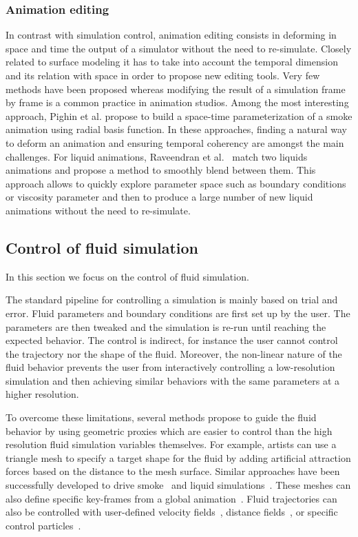 \subsubsection{Animation editing} 
In contrast with simulation control, animation editing consists in deforming in space and time the output of a simulator without the need to re-simulate. 
Closely related to surface modeling it has to take into account the temporal dimension and its relation with space in order to propose new editing tools. 
Very few methods have been proposed whereas modifying the result of a simulation frame by frame is a common practice in animation studios. 
Among the most interesting approach, Pighin et al.\cite{Pighin2004} propose to build a space-time parameterization of a smoke animation using radial basis function. 
In these approaches, finding a natural way to deform an animation and ensuring temporal coherency are amongst the main challenges. 
For liquid animations, Raveendran et al.~\cite{Raveendran2014} match two liquids animations and propose a method to smoothly blend between them. 
This approach allows to quickly explore parameter space such as boundary conditions or viscosity parameter and then to produce a large number of new liquid animations without the need to re-simulate.

\subsection{Control of fluid simulation}
\label{subsec:fluidControl}
In this section we focus on the control of fluid simulation.

The standard pipeline for controlling a simulation is mainly based on trial and error. Fluid parameters and boundary conditions are first set up by the user. The parameters are then tweaked and the simulation is re-run until reaching the expected behavior. The control is indirect, for instance the user cannot control the trajectory nor the shape of the fluid. Moreover, the non-linear nature of the fluid behavior prevents the user from interactively controlling a low-resolution simulation and then achieving similar behaviors with the same parameters at a higher resolution.

To overcome these limitations, several methods propose to guide the fluid behavior by using geometric proxies which are easier to control than the high resolution fluid simulation variables themselves.
For example, artists can use a triangle mesh to specify a target shape for the fluid by adding artificial attraction forces based on the distance to the mesh surface. Similar approaches have been successfully developed to drive smoke~\cite{Fattal2004,Hong2004,Shi2005a} and liquid simulations~\cite{Shi2005b,Raveendran2012}. These meshes can also define specific key-frames from a global animation~\cite{Treuille2003,McNamara2004}.
Fluid trajectories can also be controlled with user-defined velocity fields~\cite{Kim2006:SmokeControl}, distance fields~\cite{Yang2013}, or specific control particles~\cite{Thurey2006:FluidControl,Madill2013}. 

